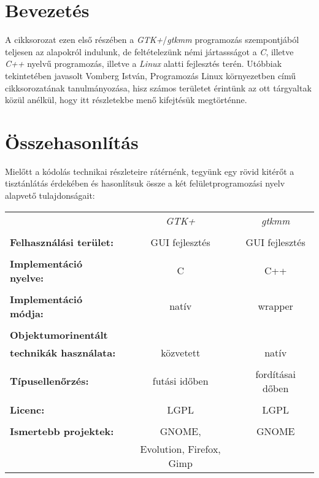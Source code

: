 \section{Bevezetés}

A cikksorozat ezen első részében a \textit{GTK+}/\textit{gtkmm} programozás szempontjából teljesen az alapokról indulunk, de feltételezünk némi jártassságot a \textit{C}, illetve \textit{C++} nyelvű programozás, illetve a \textit{Linux} alatti fejlesztés terén. Utóbbiak tekintetében javasolt Vomberg István, Programozás Linux környezetben című cikksorozatának tanulmányozása, hisz számos területet érintünk az ott tárgyaltak közül anélkül, hogy itt részletekbe menő kifejtésük megtörténne.

\section{Összehasonlítás}

Mielőtt a kódolás technikai részleteire rátérnénk, tegyünk egy rövid kitérőt a tisztánlátás érdekében és hasonlítsuk össze a két felületprogramozási nyelv alapvető tulajdonságait:\vspace{16pt}

\begin{center}
\begin{tabular}[t]{l c c}
                                       & \textit{GTK+}                     & \textit{gtkmm}   \\\\
\textbf{Felhasználási terület:}        & GUI fejlesztés                    & GUI fejlesztés   \\\\
\textbf{Implementáció nyelve:}         & C                                 & C++              \\\\
\textbf{Implementáció módja:}          & natív                             & wrapper          \\\\
\textbf{Objektumorinentált}            &                                   &                  \\
\textbf{technikák használata:}         & közvetett                         & natív            \\\\
\textbf{Típusellenőrzés:}              & futási időben                     & fordításai dőben \\\\
\textbf{Licenc:}                       & LGPL                              & LGPL             \\\\
\textbf{Ismertebb projektek:}          & GNOME,                            & GNOME            \\
                                       & Evolution, Firefox, Gimp          &                  \\
\end{tabular}
\end{center}


